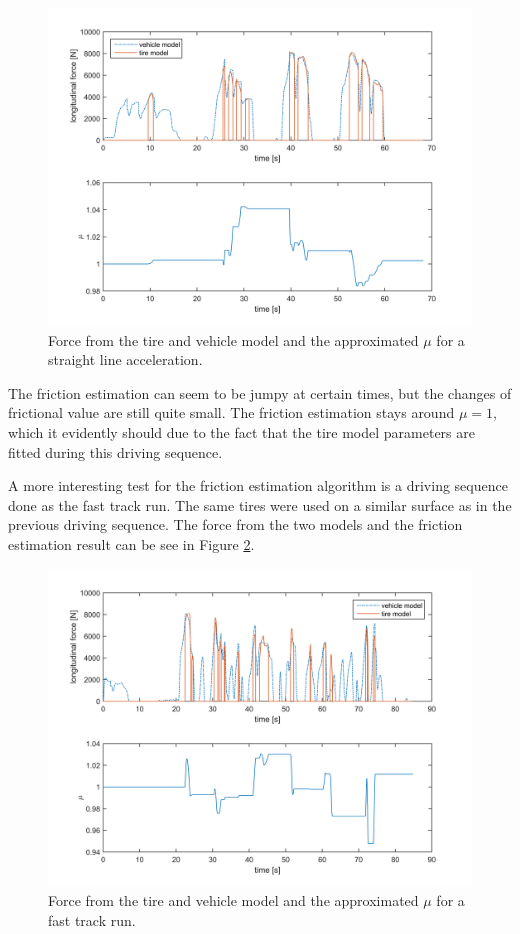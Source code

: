 \begin{figure}[h]
	\centering
	\includegraphics[width=1.0\textwidth]{Pictures/force_mue_olika_acc}
	\caption {Force from the tire and vehicle model and the approximated $ \mu $ for a straight line acceleration.}
	\label{force_mue_olika_acc}
\end{figure}

The friction estimation can seem to be jumpy at certain times, but the changes of frictional value are still quite small. The friction estimation stays around $ \mu = 1 $, which it evidently should due to the fact that the tire model parameters are fitted during this driving sequence. 

A more interesting test for the friction estimation algorithm is a driving sequence done as the fast track run. The same tires were used on a similar surface as in the previous driving sequence. The force from the two models and the friction estimation result can be see in Figure \ref{force_mue_race}. 

\begin{figure}[h]
	\centering
	\includegraphics[width=1.0\textwidth]{Pictures/force_mue_race}
	\caption {Force from the tire and vehicle model and the approximated $ \mu $ for a fast track run.}
	\label{force_mue_race}
\end{figure}

